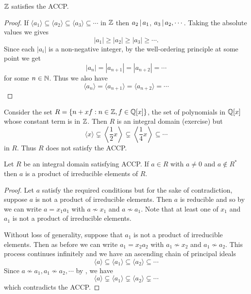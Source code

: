 \documentclass[11pt]{article}
\begin{document}
\begin{example}
    $\mathbb{Z}$ satisfies the ACCP.
\end{example}

\begin{proof}
    If $\langle a_1\rangle\subseteq\langle a_2\rangle\subseteq\langle a_3\rangle\subseteq\cdots$ in $\mathbb{Z}$ then $a_2\,|\, a_1$, $a_3\,|\, a_2,\cdots$. Taking the absolute values we gives
    \[|a_1|\geq|a_2|\geq|a_3|\geq\cdots.\]
    Since each $|a_i|$ is a non-negative integer, by the well-ordering principle at some point we get 
    \[|a_n|=|a_{n+1}|=|a_{n+2}|=\cdots\]
    for some $n\in\mathbb{N}$. Thus we also have
    \[\langle a_n\rangle=\langle a_{n+1}\rangle=\langle a_{n+2}\rangle=\cdots\]
\end{proof}

\begin{example}
    Consider the set $R=\{n+xf:n\in\mathbb{Z},f\in\mathbb{Q}[x]\}$, the set of polynomials in $\mathbb{Q}[x]$ whose constant term is in $\mathbb{Z}$. Then $R$ is an integral domain (exercise) but
    \[\langle x\rangle\subsetneq\left\langle\frac12x\right\rangle\subsetneq\left\langle\frac14x\right\rangle\subseteq\cdots\]
    in $R$. Thus $R$ does not satisfy the ACCP.
\end{example}

\begin{theorem}
    Let $R$ be an integral domain satisfying ACCP. If $a\in R$ with $a\neq0$ and $a\not\in R^*$ then $a$ is a product of irreducible elements of $R$.
\end{theorem}

\begin{proof}
    Let $a$ satisfy the required conditions but for the sake of contradiction, suppose $a$ is not a product of irreducible elements. Then $a$ is reducible and so by  we can write $a=x_1a_1$ with $a\not\sim x_1$ and $a\not\sim a_1$. Note that at least one of $x_1$ and $a_1$ is not a product of irreducible elements.
    
    Without loss of generality, suppose that $a_1$ is not a product of irreducible elements. Then as before we can write $a_1=x_2a_2$ with $a_1\not\sim x_2$ and $a_1\not\sim a_2$. This process continues infinitely and we have an ascending chain of principal ideals
    \[\langle a\rangle\subseteq\langle a_1\rangle\subseteq\langle a_2\rangle\subseteq\cdots\]
    Since $a\not\sim a_1,a_1\not\sim a_2,\cdots$ by , we have
    \[\langle a\rangle\subsetneq\langle a_1\rangle\subsetneq\langle a_2\rangle\subsetneq\cdots\]
    which contradicts the ACCP.
    
\end{proof}
\end{document}
